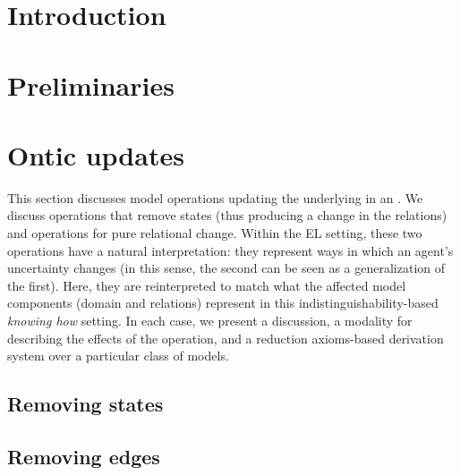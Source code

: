 \documentclass[sn-mathphys-num]{sn-jnl}%
\begin{document}
\section{Introduction}
\label{sec:intro}


\section{Preliminaries}
\label{sec:basic}






\section{Ontic updates}
\label{sec:ontic}

This section discusses model operations updating the underlying \lts in an \ults. We discuss operations that remove states (thus producing a change in the relations) and operations for pure relational change. Within the EL setting, these two operations have a natural interpretation: they represent ways in which an agent's uncertainty changes (in this sense, the second can be seen as a generalization of the first). Here, they are reinterpreted to match what the affected model components (domain and relations) represent in this indistinguishability-based \emph{knowing how} setting. In each case, we present a discussion, a modality for describing the effects of the operation, and a reduction axioms-based derivation system over a particular class of models.

\subsection{Removing states}
\label{sec:pal}


\subsection{Removing edges}
\label{sec:aul}

\end{document}
